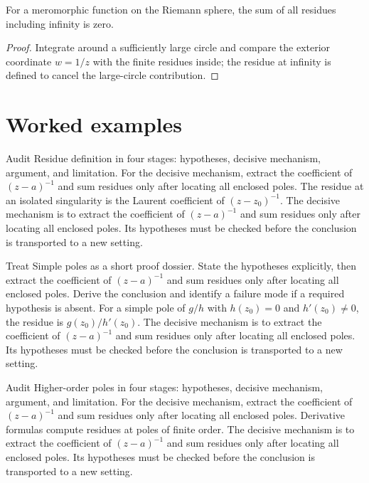 \begin{theorem}\label{thm:iv10-04}
For a meromorphic function on the Riemann sphere, the sum of all residues including infinity is zero.
\begin{proof}
Integrate around a sufficiently large circle and compare the exterior coordinate $w=1/z$ with the finite residues inside; the residue at infinity is defined to cancel the large-circle contribution.
\end{proof}
\end{theorem}

\section{Worked examples}

\begin{example}\label{ex:iv10-worked-01}
Audit Residue definition in four stages: hypotheses, decisive mechanism, argument, and limitation. For the decisive mechanism, extract the coefficient of \((z-a)^{-1}\) and sum residues only after locating all enclosed poles. The residue at an isolated singularity is the Laurent coefficient of $(z-z_0)^{-1}$. The decisive mechanism is to extract the coefficient of \((z-a)^{-1}\) and sum residues only after locating all enclosed poles. Its hypotheses must be checked before the conclusion is transported to a new setting.
\end{example}

\begin{example}\label{ex:iv10-worked-02}
Treat Simple poles as a short proof dossier. State the hypotheses explicitly, then extract the coefficient of \((z-a)^{-1}\) and sum residues only after locating all enclosed poles. Derive the conclusion and identify a failure mode if a required hypothesis is absent. For a simple pole of $g/h$ with $h(z_0)=0$ and $h'(z_0)\ne0$, the residue is $g(z_0)/h'(z_0)$. The decisive mechanism is to extract the coefficient of \((z-a)^{-1}\) and sum residues only after locating all enclosed poles. Its hypotheses must be checked before the conclusion is transported to a new setting.
\end{example}

\begin{example}\label{ex:iv10-worked-03}
Audit Higher-order poles in four stages: hypotheses, decisive mechanism, argument, and limitation. For the decisive mechanism, extract the coefficient of \((z-a)^{-1}\) and sum residues only after locating all enclosed poles. Derivative formulas compute residues at poles of finite order. The decisive mechanism is to extract the coefficient of \((z-a)^{-1}\) and sum residues only after locating all enclosed poles. Its hypotheses must be checked before the conclusion is transported to a new setting.
\end{example}

